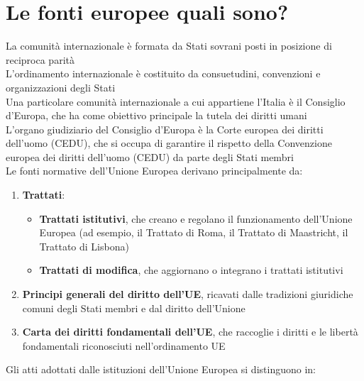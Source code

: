 \documentclass[10pt,oneside,a4paper]{article}
\begin{document}
	\section{Le fonti europee quali sono?}
	La comunità internazionale è formata da Stati sovrani posti in posizione di reciproca parità\\
	L'ordinamento internazionale è costituito da consuetudini, convenzioni e organizzazioni degli Stati\\
	Una particolare comunità internazionale a cui appartiene l'Italia è il Consiglio d'Europa, che ha come obiettivo principale la tutela dei diritti umani\\
	L'organo giudiziario del Consiglio d'Europa è la Corte europea dei diritti dell’uomo (CEDU), che si occupa di garantire il rispetto della Convenzione europea dei diritti dell'uomo (CEDU) da parte degli Stati membri\\
	Le fonti normative dell'Unione Europea derivano principalmente da:  
	\begin{enumerate}
		\item \textbf{Trattati}:  
		\begin{itemize}
			\item \textbf{Trattati istitutivi}, che creano e regolano il funzionamento dell’Unione Europea (ad esempio, il Trattato di Roma, il Trattato di Maastricht, il Trattato di Lisbona)
			\item \textbf{Trattati di modifica}, che aggiornano o integrano i trattati istitutivi
		\end{itemize}
		\item \textbf{Principi generali del diritto dell'UE}, ricavati dalle tradizioni giuridiche comuni degli Stati membri e dal diritto dell’Unione
		\item \textbf{Carta dei diritti fondamentali dell'UE}, che raccoglie i diritti e le libertà fondamentali riconosciuti nell’ordinamento UE
	\end{enumerate}
	Gli atti adottati dalle istituzioni dell'Unione Europea si distinguono in:  
\end{document}
